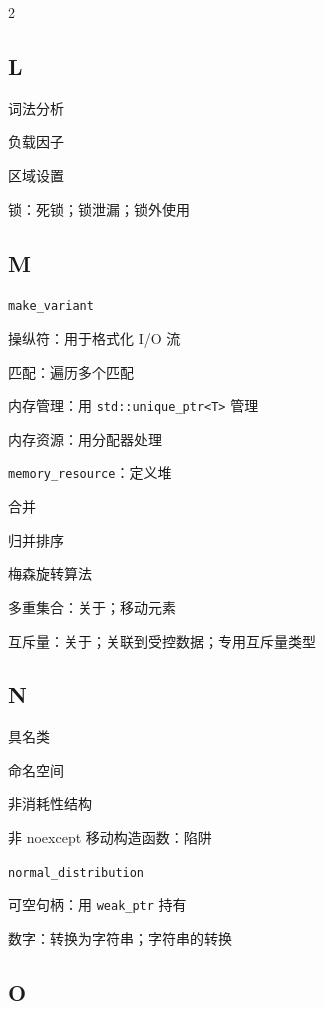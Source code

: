 \begin{multicols}{2}
\subsection*{L}

\noindent 词法分析\par
\noindent 负载因子\par
\noindent 区域设置\par
\noindent 锁：死锁；锁泄漏；锁外使用\par

\subsection*{M}

\noindent \texttt{make\_\allowbreak{}variant}\par
\noindent 操纵符：用于格式化 I/O 流\par
\noindent 匹配：遍历多个匹配\par
\noindent 内存管理：用 \texttt{std::\allowbreak{}unique\_\allowbreak{}ptr<\allowbreak{}T>\allowbreak{}} 管理\par
\noindent 内存资源：用分配器处理\par
\noindent \texttt{memory\_\allowbreak{}resource}：定义堆\par
\noindent 合并\par
\noindent 归并排序\par
\noindent 梅森旋转算法\par
\noindent 多重集合：关于；移动元素\par
\noindent 互斥量：关于；关联到受控数据；专用互斥量类型\par

\subsection*{N}

\noindent 具名类\par
\noindent 命名空间\par
\noindent 非消耗性结构\par
\noindent 非 noexcept 移动构造函数：陷阱\par
\noindent \texttt{normal\_\allowbreak{}distribution}\par
\noindent 可空句柄：用 \texttt{weak\_\allowbreak{}ptr} 持有\par
\noindent 数字：转换为字符串；字符串的转换\par

\subsection*{O}


\end{multicols}
